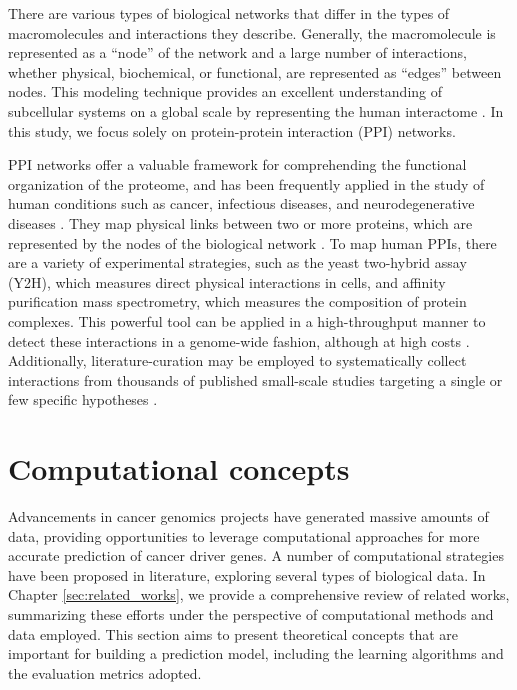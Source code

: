 There are various types of biological networks that differ in the types of macromolecules and interactions they describe. Generally, the macromolecule is represented as a ``node'' of the network and a large number of interactions, whether physical, biochemical, or functional, are represented as ``edges'' between nodes. This modeling technique provides an excellent understanding of subcellular systems on a global scale by representing the human interactome \cite{liu2020computational}. In this study, we focus solely on protein-protein interaction (PPI) networks.

PPI networks offer a valuable framework for comprehending the functional organization of the proteome, and has been frequently applied in the study of human conditions such as cancer, infectious diseases, and neurodegenerative diseases \cite{lu2020recent}. They map physical links between two or more proteins, which are represented by the nodes of the biological network \cite{liu2020computational}. To map human PPIs, there are a variety of experimental strategies, such as the yeast two-hybrid assay (Y2H), which measures direct physical interactions in cells, and affinity purification mass spectrometry, which measures the composition of protein complexes. This powerful tool can be applied in a high-throughput manner to detect these interactions in a genome-wide fashion, although at high costs \cite{stelzl2005human}. Additionally, literature-curation may be employed to systematically collect interactions from thousands of published small-scale studies targeting a single or few specific hypotheses \cite{hint}.




\section{Computational concepts}
\label{sec:comp_concepts}

Advancements in cancer genomics projects have generated massive amounts of data, providing opportunities to leverage computational approaches for more accurate prediction of cancer driver genes. A number of computational strategies have been proposed in literature, exploring several types of biological data. 
In Chapter \ref{sec:related_works}, we provide a comprehensive review of related works, summarizing these efforts under the perspective of computational methods and data employed. This section aims to present theoretical concepts that are important for building a prediction model, including the learning algorithms and the evaluation metrics adopted. 


